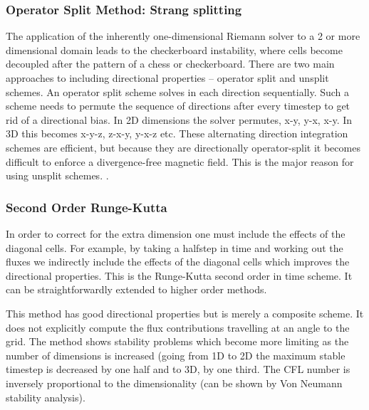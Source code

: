 \subsubsection{Operator Split Method: Strang splitting}
The application of the inherently one-dimensional Riemann solver to a 2 or
more dimensional domain leads to the checkerboard instability,  where cells
become decoupled after the pattern of a chess or checkerboard. 
There are two main approaches to including directional properties -- operator split and unsplit schemes.
An operator split scheme solves in each direction sequentially. 
Such a scheme needs to permute the sequence of directions after every timestep to get rid of a
directional bias. In 2D dimensions the solver permutes, x-y, y-x, x-y. In 3D this
becomes x-y-z, z-x-y, y-x-z etc. 
These alternating direction integration schemes are efficient, but because they are directionally operator-split it becomes difficult to enforce a divergence-free magnetic field. This is the major reason for using unsplit schemes.
\citep{Strang:1968:CCD}.

\subsubsection{Second Order Runge-Kutta }



In order to
correct for the extra dimension one must include the effects of the diagonal
cells. For example, by taking a halfstep in time and working out the fluxes we
indirectly include the effects of the diagonal cells which improves the
directional properties. This is the Runge-Kutta second order in time scheme. It can be straightforwardly extended to higher order methods.

This method has good directional properties but is merely a composite scheme. 
It does not explicitly compute the flux contributions travelling at an angle to
the grid. The method shows stability problems which become more limiting as the number of
dimensions is increased (going from 1D to 2D the maximum stable timestep is
decreased by one half and to 3D, by one third.
The CFL number is inversely proportional to the dimensionality (can be shown by Von Neumann stability analysis).

